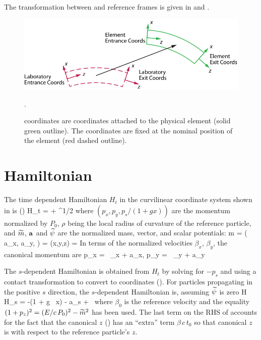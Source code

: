 The transformation between  and  reference
frames is given in  and .


\begin{figure}[tb]
  \centering
  \includegraphics[width=5in]{coord-offset.pdf}
  \caption[Element Coordinate System.]
  {
 coordinates are coordinates attached to the physical
element (solid green outline). The  coordinates are
fixed at the nominal position of the element (red dashed outline).
  }
  \label{f:ele.coord}.
\end{figure}

\section{Hamiltonian}
\label{s:mag.hamiltonian}
The time dependent Hamiltonian $H_t$ in the curvilinear coordinate system shown
in  is (\cite{b:ruth})
\Begineq
  H_t = \wt\psi + ^{1/2}
\Endeq
where $(p_x, p_y, p_s/(1+gx))$ are the momentum normalized by $P_0$,
$\rho$ being the local radius of curvature of the reference particle,
and $\widetilde m$, ${\bf a}$ and $\widetilde\psi$ are the normalized mass, vector, and scalar
potentials:
\Begineq
  \wt m =  \qquad
  \left( a_x, a_y,  \right) =  \qquad 
  \wt\psi(x,y,z) = 
  \label{mmccp}
\Endeq
In terms of the normalized velocities $\beta_x$, $\beta_y$, the canonical momentum are
\Begineq
  p_x =  \, \beta_x + a_x, \qquad 
  p_y =  \, \beta_y + a_y
  \label{pmc2pc}
\Endeq

The $s$-dependent Hamiltonian is obtained from $H_t$ by solving for
$-p_s$ and using a contact transformation to convert to \bmad
coordinates (). For particles propagating in the
positive $s$ direction, the $s$-dependent Hamiltonian is, assuming
$\widetilde\psi$ is zero
\Begineq
  H \equiv H_s = -(1 + g \, x)  - 
  a_s +  \, 
  \label{h1gx1}
\Endeq
where $\beta_0$ is the reference velocity and the equality $(1 +
p_z)^2 = (E/c\, P_0)^2 - \widetilde m^2$ has been used. The last term on the
RHS of  accounts for the fact that the \bmad canonical $z$
() has an ``extra'' term $\beta \, c \, t_0$ so that \bmad
canonical $z$ is with respect to the reference particle's $z$.

